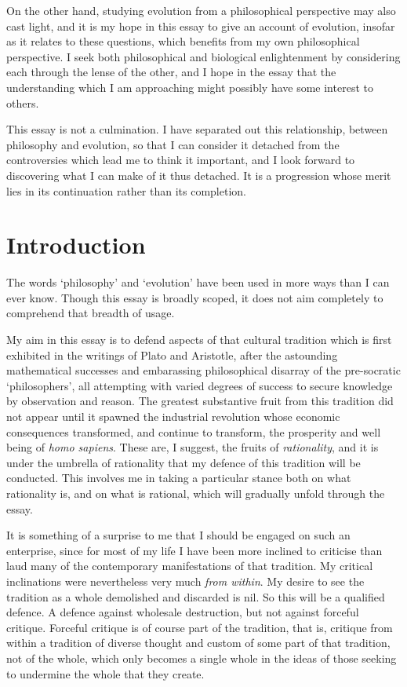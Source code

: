 \documentclass[10pt,titlepage]{book}
\begin{document}
On the other hand, studying evolution from a philosophical perspective may also cast light, and it is my hope in this essay to give an account of evolution, insofar as it relates to these questions, which benefits from my own philosophical perspective.
I seek both philosophical and biological enlightenment by considering each through the lense of the other, and I hope in the essay that the understanding which I am approaching might possibly have some interest to others.

This essay is not a culmination.
I have separated out this relationship, between philosophy and evolution, so that I can consider it detached from the controversies which lead me to think it important, and I look forward to discovering what I can make of it thus detached.
It is a progression whose merit lies in its continuation rather than its completion.

\section{Introduction}

The words `philosophy' and `evolution' have been used in more ways than I can ever know.
Though this essay is broadly scoped, it does not aim completely to comprehend that breadth of usage.

My aim in this essay is to defend aspects of that cultural tradition which is first exhibited in the writings of Plato and Aristotle, after the astounding mathematical successes and embarassing philosophical disarray of the pre-socratic `philosophers', all attempting with varied degrees of success to secure knowledge by observation and reason.
The greatest substantive fruit from this tradition did not appear until it spawned the industrial revolution whose economic consequences transformed, and continue to transform, the prosperity and well being of \emph{homo sapiens}.
These are, I suggest, the fruits of \emph{rationality}, and it is under the umbrella of rationality that my defence of this tradition will be conducted.
This involves me in taking a particular stance both on what rationality is, and on what is rational, which will gradually unfold through the essay.

It is something of a surprise to me that I should be engaged on such an enterprise, since for most of my life I have been more inclined to criticise than laud many of the contemporary manifestations of that tradition.
My critical inclinations were nevertheless very much \emph{from within}.
My desire to see the tradition as a whole demolished and discarded is nil.
So this will be a qualified defence.
A defence against wholesale destruction, but not against forceful critique.
Forceful critique is of course part of the tradition, that is, critique from within a tradition of diverse thought and custom of some part of that tradition, not of the whole, which only becomes a single whole in the ideas of those seeking to undermine the whole that they create.
\end{document}

